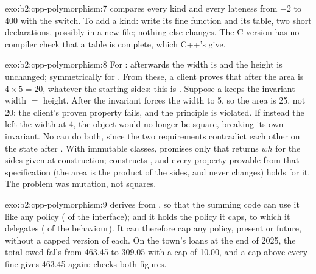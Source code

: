 \begin{solution}{exo:b2:cpp-polymorphism:7}
 compares every kind and every lateness from $-2$ to 400 with the switch. To add a
kind: write its fine function and its table, two short declarations, possibly in a new file; nothing else changes.
The C version has no compiler check that a table is complete, which C++'s  give.
\end{solution}

\begin{solution}{exo:b2:cpp-polymorphism:8}
For : afterwards the width is  and the height is unchanged; symmetrically for
. From these, a client proves that after  the area is
$4 \times 5 = 20$, whatever the starting sides: this is . Suppose a  keeps the invariant
width $=$ height. After  the invariant forces the width to 5, so the area is 25, not 20: the
client's proven property fails, and the principle is violated. If instead the  left the width at 4, the
object would no longer be square, breaking its own invariant. No  can do both, since the two requirements
contradict each other on the state after . With immutable classes, 
promises only that  returns $wh$ for the sides given at construction;  constructs
, and every property provable from that specification (the area is the product of the sides,
and never changes) holds for it. The problem was mutation, not squares.
\end{solution}

\begin{solution}{exo:b2:cpp-polymorphism:9}
 derives from , so that the summing code can use it like any policy
( of the interface); and it holds the policy it caps, to which it delegates ( of the
behaviour). It can therefore cap any policy, present or future, without a capped version of each. On the town's loans
at the end of 2025, the total owed falls from 463.45 to 309.05 with a cap of 10.00, and a cap above every fine gives
463.45 again;  checks both figures.
\end{solution}

